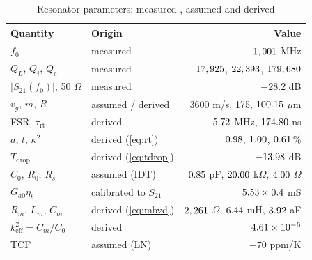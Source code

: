 \documentclass[journal]{IEEEtran}
\begin{document}
\begin{table}[!t]
\caption{Resonator parameters: measured \cite{ji2026}, assumed and derived}
\label{tab:res}
\centering
\begin{tabular}{llr}
\toprule
Quantity & Origin & Value \\
\midrule
$f_0$ & measured & $1,001$ MHz\\
$Q_L$, $Q_i$, $Q_c$ & measured & $17,925$, $22,393$, $179,680$\\
$|S_{21}(f_0)|$, 50 $\Omega$ & measured & $-28.2$ dB\\
$v_g$, $m$, $R$ & assumed / derived & 3600 m/s, 175, $100.15$ $\mu$m\\
FSR, $\tau_{\mathrm{rt}}$ & derived & $5.72$ MHz, $174.80$ ns\\
$a$, $t$, $\kappa^2$ & derived (\ref{eq:rt}) & $0.98$, $1.00$, $0.61$\,\%\\
$T_{\mathrm{drop}}$ & derived (\ref{eq:tdrop}) & $-13.98$ dB\\
$C_0$, $R_0$, $R_s$ & assumed (IDT) & $0.85$ pF, $20.00$ k$\Omega$, $4.00$ $\Omega$\\
$G_{a0}\eta_t$ & calibrated to $S_{21}$ & $5.53\times0.4$ mS\\
$R_m$, $L_m$, $C_m$ & derived (\ref{eq:mbvd}) & $2,261$ $\Omega$, $6.44$ mH, $3.92$ aF\\
$k_{\mathrm{eff}}^2=C_m/C_0$ & derived & $4.61\times10^{-6}$\\
TCF & assumed (LN) & $-70$ ppm/K\\
\bottomrule
\end{tabular}
\end{table}
\end{document}
